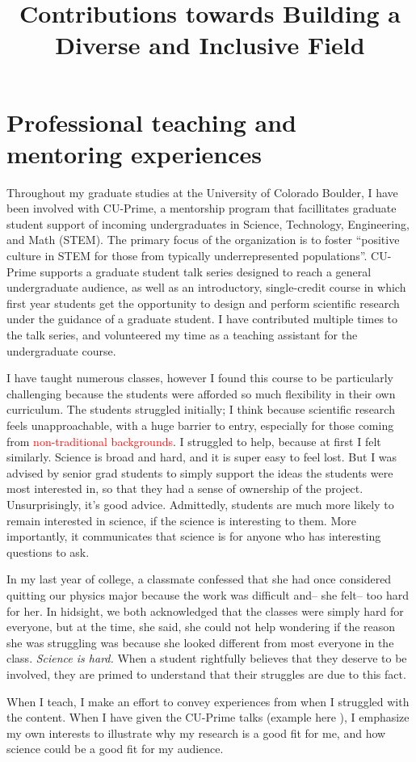 \documentclass{article}
\title{Contributions towards Building a Diverse and Inclusive Field}
\author{}
\date{}
\begin{document}
\maketitle
\section*{Professional teaching and mentoring experiences}
Throughout my graduate studies at the University of Colorado Boulder, I have been involved with CU-Prime, a mentorship program that facillitates graduate student support of incoming undergraduates in Science, Technology, Engineering, and Math (STEM). 
The primary focus of the organization is to foster ``positive culture in STEM for those from typically underrepresented populations''\cite{cup}.
CU-Prime supports a graduate student talk series designed to reach a general undergraduate audience, as well as an introductory, single-credit course in which first year students get the opportunity to design and perform scientific research under the guidance of a graduate student. 
I have contributed multiple times to the talk series, and volunteered my time as a teaching assistant for the undergraduate course. 

I have taught numerous classes, however I found this course to be particularly challenging because the students were afforded so much flexibility in their own curriculum.
The students struggled initially; I think because scientific research feels unapproachable, with a huge barrier to entry, especially for those coming from \textcolor{red}{non-traditional backgrounds}. 
I struggled to help, because at first I felt similarly. Science is broad and hard, and it is super easy to feel lost.
But I was advised by senior grad students to simply support the ideas the students were most interested in, so that they had a sense of ownership of the project.
Unsurprisingly, it's good advice.
Admittedly, students are much more likely to remain interested in science, if the science is interesting to them. More importantly, it communicates that science is for anyone who has interesting questions to ask.

In my last year of college, a classmate confessed that she had once considered quitting our physics major because the work was difficult and-- she felt-- too hard for her. In hidsight, we both acknowledged that the classes were simply hard for everyone, but at the time, she said, she could not help wondering if the reason she was struggling was because she looked different from most everyone in the class.
\textit{Science is hard.} When a student rightfully believes that they deserve to be involved, they are primed to understand that their struggles are due to this fact. 

When I teach, I make an effort to convey experiences from when I struggled with the content. When I have given the CU-Prime talks (example here \cite{jJ22}), I emphasize my own interests to illustrate why my research is a good fit for me, and how science could be a good fit for my audience.
\printbibliography
\end{document}
